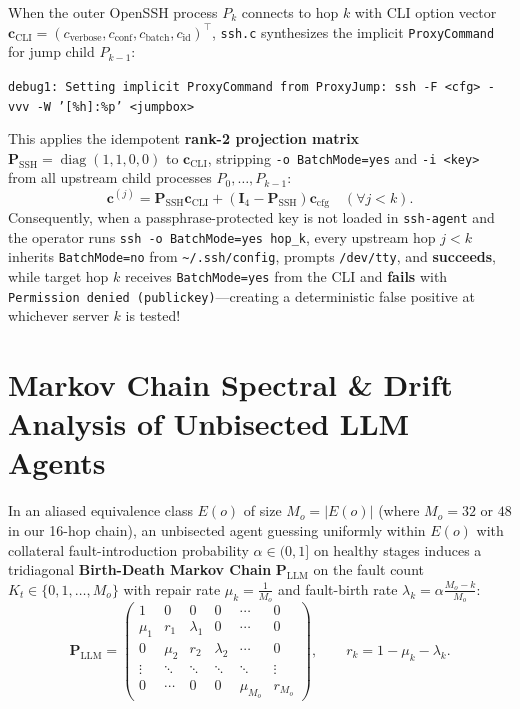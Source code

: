 \documentclass[11pt,a4paper]{article}
\theoremstyle{definition}
\theoremstyle{remark}
\begin{document}
When the outer OpenSSH process $P_k$ connects to hop $k$ with CLI option vector $\bm{c}_{\text{CLI}} = (c_{\text{verbose}}, c_{\text{conf}}, c_{\text{batch}}, c_{\text{id}})^\top$, \texttt{ssh.c} synthesizes the implicit \texttt{ProxyCommand} for jump child $P_{k-1}$:
\begin{center}
    \texttt{debug1: Setting implicit ProxyCommand from ProxyJump: ssh -F <cfg> -vvv -W '[\%h]:\%p' <jumpbox>}
\end{center}
This applies the idempotent \textbf{rank-2 projection matrix} $\mathbf{P}_{\text{SSH}} = \operatorname{diag}(1, 1, 0, 0)$ to $\bm{c}_{\text{CLI}}$, stripping \texttt{-o BatchMode=yes} and \texttt{-i <key>} from all upstream child processes $P_0, \dots, P_{k-1}$:
\begin{equation}
    \bm{c}^{(j)} = \mathbf{P}_{\text{SSH}} \bm{c}_{\text{CLI}} + (\mathbf{I}_4 - \mathbf{P}_{\text{SSH}}) \bm{c}_{\text{cfg}} \quad (\forall j < k).
\end{equation}
Consequently, when a passphrase-protected key is not loaded in \texttt{ssh-agent} and the operator runs \texttt{ssh -o BatchMode=yes hop\_k}, every upstream hop $j < k$ inherits \texttt{BatchMode=no} from \texttt{\textasciitilde/.ssh/config}, prompts \texttt{/dev/tty}, and \textbf{succeeds}, while target hop $k$ receives \texttt{BatchMode=yes} from the CLI and \textbf{fails} with \texttt{Permission denied (publickey)}---creating a deterministic false positive at whichever server $k$ is tested!

\section{Markov Chain Spectral \& Drift Analysis of Unbisected LLM Agents}

In an aliased equivalence class $E(o)$ of size $M_o = |E(o)|$ (where $M_o = 32$ or $48$ in our 16-hop chain), an unbisected agent guessing uniformly within $E(o)$ with collateral fault-introduction probability $\alpha \in (0,1]$ on healthy stages induces a tridiagonal \textbf{Birth-Death Markov Chain} $\mathbf{P}_{\text{LLM}}$ on the fault count $K_t \in \{0, 1, \dots, M_o\}$ with repair rate $\mu_k = \frac{1}{M_o}$ and fault-birth rate $\lambda_k = \alpha \frac{M_o - k}{M_o}$:
\begin{equation}
    \mathbf{P}_{\text{LLM}} = \begin{pmatrix}
        1 & 0 & 0 & 0 & \cdots & 0 \\
        \mu_1 & r_1 & \lambda_1 & 0 & \cdots & 0 \\
        0 & \mu_2 & r_2 & \lambda_2 & \cdots & 0 \\
        \vdots & \ddots & \ddots & \ddots & \ddots & \vdots \\
        0 & \cdots & 0 & 0 & \mu_{M_o} & r_{M_o}
    \end{pmatrix}, \qquad r_k = 1 - \mu_k - \lambda_k.
\end{equation}
\end{document}
